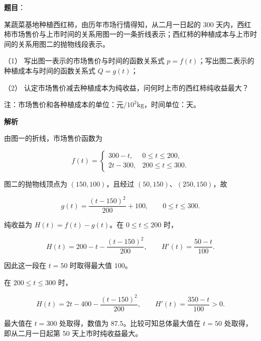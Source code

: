 \begin{answer}

\textbf{题目}：

某蔬菜基地种植西红柿，由历年市场行情得知，从二月一日起的 300 天内，西红柿市场售价与上市时间的关系用图一的一条折线表示；西红柿的种植成本与上市时间的关系用图二的抛物线段表示。

（1） 写出图一表示的市场售价与时间的函数关系式 $p=f(t)$；写出图二表示的种植成本与时间的函数关系式 $Q=g(t)$；

（2） 认定市场售价减去种植成本为纯收益，问何时上市的西红柿纯收益最大？

注：市场售价和各种植成本的单位：元/$10^2\mathrm{kg}$，时间单位：天。
\nopagebreak[4]
\begin{center}\end{center}
\nopagebreak[4]
\textbf{解析}


由图一的折线，市场售价函数为

\nopagebreak[4]
\[
f(t)=
\begin{cases}
300-t,&0\le t\le200,\\
2t-300,&200\le t\le300.
\end{cases}
\]

图二的抛物线顶点为 $(150,100)$，且经过 $(50,150)$、$(250,150)$，故

\nopagebreak[4]
\[
g(t)=\frac{(t-150)^2}{200}+100,
\qquad0\le t\le300.
\]


纯收益为 $H(t)=f(t)-g(t)$。在 $0\le t\le200$ 时，

\nopagebreak[4]
\[
H(t)=200-t-\frac{(t-150)^2}{200},
\qquad
H'(t)=\frac{50-t}{100}.
\]

因此这一段在 $t=50$ 时取得最大值 $100$。

在 $200\le t\le300$ 时，

\nopagebreak[4]
\[
H(t)=2t-400-\frac{(t-150)^2}{200},
\qquad
H'(t)=\frac{350-t}{100}>0.
\]

最大值在 $t=300$ 处取得，数值为 $87.5$。比较可知总体最大值在 $t=50$ 处取得，即从二月一日起第 50 天上市时纯收益最大。



\end{answer}
